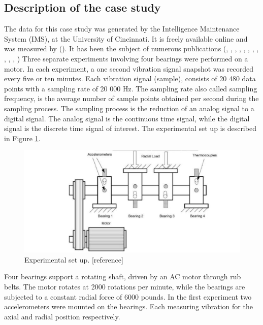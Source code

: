 \documentclass[../Main/thesis.tex]{subfiles}
\begin{document}
\subsection{Description of the case study}
\label{sec:case}
The data for this case study was generated by the Intelligence Maintenance System (IMS), at the University of Cincinnati. It is freely available online and was measured by (\cite{lee2007}). It has been the subject of numerous publications
(\cite{hai2006}, \cite{mejia2010}, \cite{fangtao2011}, \cite{mejia2011}, \cite{mortada2011}, \cite{rego2011}, \cite{yacout2012}, \cite{sergey2012} , \cite{of2012}, \cite{jianbo2012a}, \cite{jianbo2012b}, \cite{mejia2012} )
\justify
Three separate experiments involving four bearings were performed on a motor. In each experiment, a one second vibration signal snapshot was recorded every five or ten minutes. Each vibration signal (sample), consists of 20 480 data points with a sampling rate of 20 000 Hz.
The sampling rate also called sampling frequency, is the average number of sample points obtained per second during the sampling process. The sampling process is the reduction of an analog signal to a digital signal. The analog signal is the continuous time signal, while the digital signal is the discrete time signal of interest. The experimental set up is described in Figure \ref{fig:exp}.
\begin{figure}[H] %
   \centering
   \includegraphics[width=7in]{../fig/experiment} 
   \caption{Experimental set up. [reference]}
   \label{fig:exp}
\end{figure}
\justify
Four bearings support a rotating shaft, driven by an AC motor through rub belts. The motor rotates at 2000 rotations per minute, while the bearings are subjected to a constant radial force of 6000 pounds. In the first experiment two accelerometers were mounted on the bearings. Each measuring vibration for the axial and radial position respectively.
\end{document}

